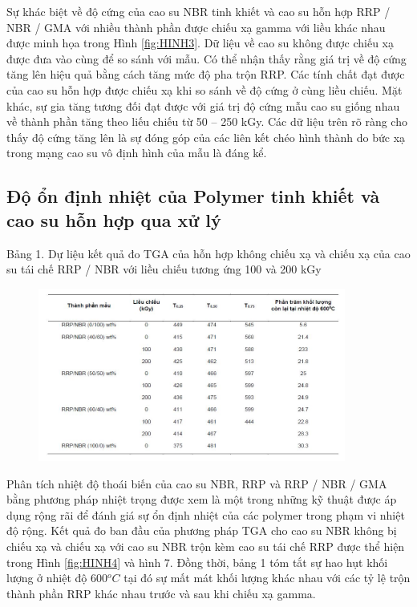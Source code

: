 \documentclass[12pt,a4paper]{article}
\begin{document}
	Sự khác biệt về độ cứng của cao su NBR tinh khiết và cao su hỗn hợp RRP / NBR / GMA với nhiều thành phần được chiếu xạ gamma với liều khác nhau được minh họa trong Hình \ref{fig:HINH3}. Dữ liệu về cao su không được chiếu xạ được đưa vào cùng để so sánh với mẫu. Có thể nhận thấy rằng giá trị về độ cứng tăng lên hiệu quả bằng cách tăng mức độ pha trộn RRP. Các tính chất đạt được của cao su hỗn hợp được chiếu xạ khi so sánh về độ cứng ở cùng liều chiếu. Mặt khác, sự gia tăng tương đối đạt được với giá trị độ cứng mẫu cao su giống nhau về thành phần tăng theo liếu chiếu từ 50 – 250 kGy. Các dữ liệu trên rõ ràng cho thấy độ cứng tăng lên là sự đóng góp của các liên kết chéo hình thành do bức xạ trong mạng cao su vô định hình của mẫu là đáng kể.
	
	
	
	
	\subsection{Độ ổn định nhiệt của Polymer tinh khiết và cao su hỗn hợp qua xử lý}
Bảng 1. Dự liệu kết quả đo TGA của hỗn hợp không chiếu xạ và chiếu xạ của cao su tái chế RRP / NBR với liều chiếu tương ứng 100 và 200 kGy\\
	\begin{figure}[h]
			\includegraphics[width=0.9\textwidth]{BANG1.JPG}		
			\label{fig:BANG1}
	\end{figure}
	
	Phân tích nhiệt độ thoái biến của cao su NBR, RRP và RRP / NBR / GMA bằng phương pháp nhiệt trọng được xem là một trong những kỹ thuật được áp dụng rộng rãi để đánh giá sự ổn định nhiệt của các polymer trong phạm vi nhiệt độ rộng. Kết quả đo ban đầu của phương pháp TGA cho cao su NBR không bị chiếu xạ và chiếu xạ với cao su NBR trộn kèm cao su tái chế RRP được thể hiện trong Hình \ref{fig:HINH4} và hình 7. Đồng thời, bảng 1 tóm tắt sự hao hụt khối lượng ở nhiệt độ 600$^oC$ tại đó sự mất mát khối lượng khác nhau với các tỷ lệ trộn thành phần RRP khác nhau trước và sau khi chiếu xạ gamma.\\
	
\end{document}
